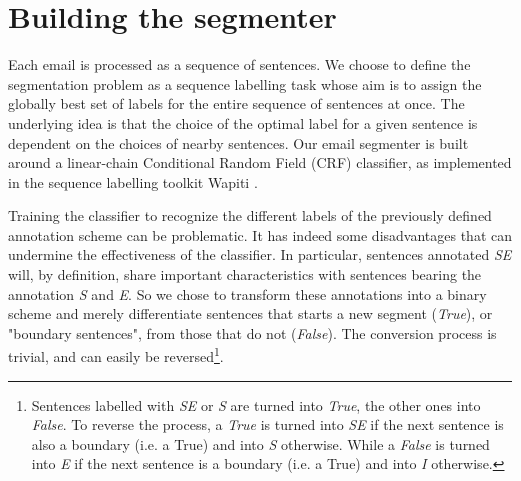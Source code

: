 
\section{Building the segmenter}
\label{sec:buildingTheSegmenter}
Each email is processed as a sequence of sentences.
We choose to define the segmentation problem as a sequence labelling task whose aim is to assign the globally best set of labels for the entire sequence of sentences at once. The underlying idea is that the choice of the optimal label for a given sentence is dependent on the choices of nearby sentences.
%
%
Our email segmenter is built around a linear-chain Conditional Random Field (CRF) classifier, as implemented in the sequence labelling toolkit Wapiti \cite{lavergne2010practical}. 

Training the classifier to recognize the different labels of the previously defined annotation scheme can be problematic. It has indeed some disadvantages that can undermine the effectiveness of the classifier. In particular, sentences annotated \textit{SE} will, by definition, share important characteristics with sentences bearing the annotation \textit{S} and \textit{E}. 
So we chose to transform these annotations into a binary scheme and merely differentiate sentences that starts a new segment (\textit{True}), or "boundary sentences", from those that do not (\textit{False}). The conversion process is trivial, and can easily be reversed\footnote{Sentences labelled with \textit{SE} or \textit{S} are turned into \textit{True}, the other ones into \textit{False}. To reverse the process, a \textit{True} is turned into \textit{SE} if the next sentence is also a boundary (i.e. a True) and into \textit{S} otherwise. While a \textit{False} is turned into \textit{E} if the next sentence is a boundary (i.e. a True) and into  \textit{I} otherwise.}.

